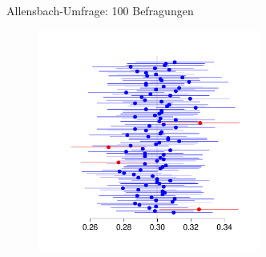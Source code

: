 \documentclass[usenames,dvipsnames,handout]{beamer}
\begin{document}
\begin{frame}{Allensbach-Umfrage: 100 Befragungen}
  \begin{figure}[ht]
 	\centering
 	      \includegraphics[width=0.65\textwidth]{umfrageConfi.pdf}%
 	\end{figure}
\end{frame}
\end{document}
